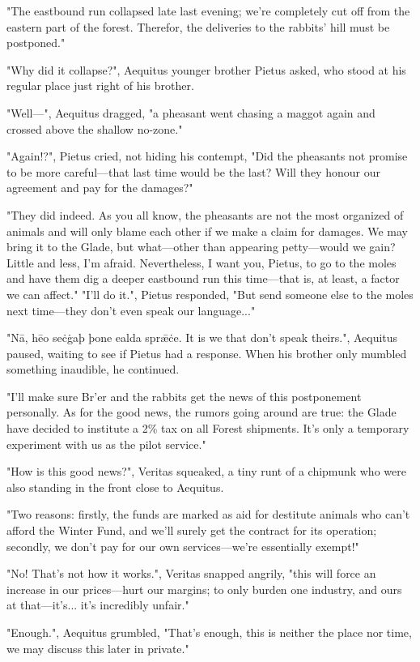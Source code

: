 "The eastbound run collapsed late last evening; we're completely cut off from the eastern part of the forest. Therefor, the deliveries to the rabbits' hill must be postponed."

"Why did it collapse?", Aequitus younger brother Pietus asked, who stood at his regular place just right of his brother.

"Well---", Aequitus dragged, "a pheasant went chasing a maggot again and crossed above the shallow no-zone."

"Again!?", Pietus cried, not hiding his contempt, "Did the pheasants not promise to be more careful---that last time would be the last? Will they honour our agreement and pay for the damages?"

"They did indeed. As you all know, the pheasants are not the most organized of animals and will only blame each other if we make a claim for damages. We may bring it to the Glade, but what---other than appearing petty---would we gain? Little and less, I'm afraid. Nevertheless, I want you, Pietus, to go to the moles and have them dig a deeper eastbound run this time---that is, at least, a factor we can affect."
"I'll do it.", Pietus responded, "But send someone else to the moles next time---they don't even speak our language..." %

"Nā, hēo seċġaþ þone ealda sprǣċe. It is we that don't speak theirs.", Aequitus paused, waiting to see if Pietus had a response. When his brother only mumbled something inaudible, he continued.

"I'll make sure Br'er and the rabbits get the news of this postponement personally. As for the good news, the rumors going around are true: the Glade have decided to institute a 2\% tax on all Forest shipments. It's only a temporary experiment with us as the pilot service."

"How is this good news?", Veritas squeaked, a tiny runt of a chipmunk who were also standing in the front close to Aequitus.

"Two reasons: firstly, the funds are marked as aid for destitute animals who can't afford the Winter Fund, and we'll surely get the contract for its operation; secondly, we don't pay for our own services---we're essentially exempt!"

"No! That's not how it works.", Veritas snapped angrily, "this will force an increase in our prices---hurt our margins; to only burden one industry, and ours at that---it's... it's incredibly unfair."

"Enough.", Aequitus grumbled, "That's enough, this is neither the place nor time, we may discuss this later in private."

